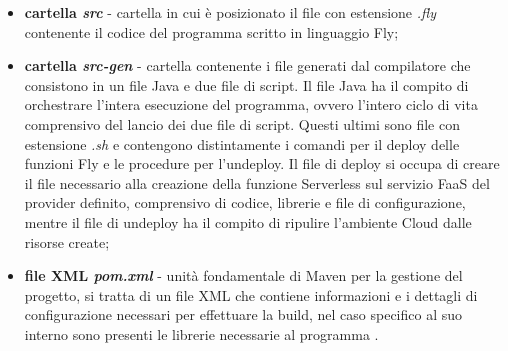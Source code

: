 \begin{itemize}
    \item \textbf{cartella \textit{src}} - cartella in cui è posizionato il file con estensione \textit{.fly} contenente il codice del programma scritto in linguaggio Fly;
    
    \item \textbf{cartella \textit{src-gen}} - cartella contenente i file generati dal compilatore che consistono in un file Java e due file di script. Il file Java ha il compito di orchestrare l'intera esecuzione del programma, ovvero l'intero ciclo di vita comprensivo del lancio dei due file di script. Questi ultimi sono file con estensione \textit{.sh} e contengono distintamente i comandi per il deploy delle funzioni Fly e le procedure per l'undeploy. Il file di deploy si occupa di creare il file necessario alla creazione della funzione Serverless sul servizio FaaS del provider definito, comprensivo di codice, librerie e file di configurazione, mentre il file di undeploy ha il compito di ripulire l'ambiente Cloud dalle risorse create;
    
    \item \textbf{file XML \textit{pom.xml}} - unità fondamentale di Maven per la gestione del progetto, si tratta di un file XML che contiene informazioni e i dettagli di configurazione necessari per effettuare la build, nel caso specifico al suo interno sono presenti le librerie necessarie al programma \cite{MavenPom}.
\end{itemize}

